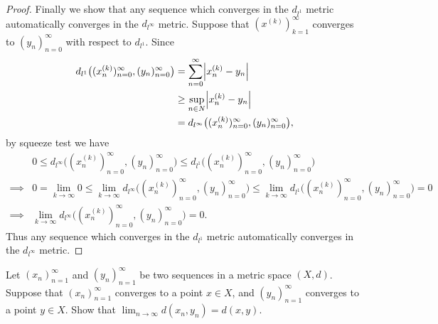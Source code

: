 \begin{proof}
  Finally we show that any sequence which converges in the \(d_{l^1}\) metric automatically converges in the \(d_{l^\infty}\) metric.
  Suppose that \((x^{(k)})_{k = 1}^\infty\) converges to \((y_n)_{n = 0}^\infty\) with respect to \(d_{l^1}\).
  Since
  \begin{align*}
    d_{l^1}\big((x_n^{(k)})_{n = 0}^\infty, (y_n)_{n = 0}^\infty\big) & = \sum_{n = 0}^\infty \abs{x_n^{(k)} - y_n}                               \\
                                                                      & \geq \sup_{n \in N} \abs{x_n^{(k)} - y_n}                                 \\
                                                                      & = d_{l^\infty}\big((x_n^{(k)})_{n = 0}^\infty, (y_n)_{n = 0}^\infty\big),
  \end{align*}
  by squeeze test we have
  \begin{align*}
             & 0 \leq d_{l^\infty}\big((x_n^{(k)})_{n = 0}^\infty, (y_n)_{n = 0}^\infty\big) \leq d_{l^1}\big((x_n^{(k)})_{n = 0}^\infty, (y_n)_{n = 0}^\infty\big)                                                                     \\
    \implies & 0 = \lim_{k \to \infty} 0 \leq \lim_{k \to \infty} d_{l^\infty}\big((x_n^{(k)})_{n = 0}^\infty, (y_n)_{n = 0}^\infty\big) \leq \lim_{k \to \infty} d_{l^1}\big((x_n^{(k)})_{n = 0}^\infty, (y_n)_{n = 0}^\infty\big) = 0 \\
    \implies & \lim_{k \to \infty} d_{l^\infty}\big((x_n^{(k)})_{n = 0}^\infty, (y_n)_{n = 0}^\infty\big) = 0.
  \end{align*}
  Thus any sequence which converges in the \(d_{l^1}\) metric automatically converges in the \(d_{l^\infty}\) metric.
\end{proof}

\begin{ex}\label{ii:ex:1.1.16}
  Let \((x_n)_{n = 1}^\infty\) and \((y_n)_{n = 1}^\infty\) be two sequences in a metric space \((X, d)\).
  Suppose that \((x_n)_{n = 1}^\infty\) converges to a point \(x \in X\), and \((y_n)_{n = 1}^\infty\) converges to a point \(y \in X\).
  Show that \(\lim_{n \to \infty} d(x_n, y_n) = d(x, y)\).
\end{ex}

